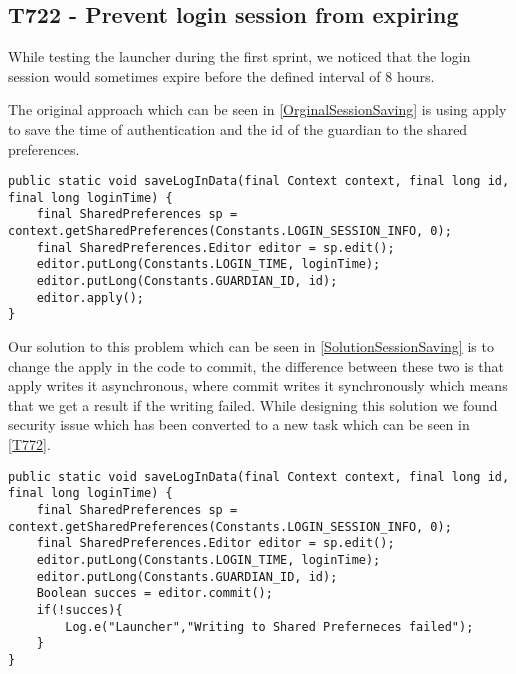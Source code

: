 \subsection{T722 - Prevent login session from expiring}
While testing the launcher during the first sprint, we noticed that the login
session would sometimes expire before the defined interval of 8 hours.\nl

The original approach which can be seen in \autoref{OrginalSessionSaving} is
using apply to save the time of authentication and the id of the guardian to
the shared preferences.\nl

\begin{minipage}[H]{\linewidth}
\begin{lstlisting}[caption = Original approach to saving login session, label =
OrginalSessionSaving]
public static void saveLogInData(final Context context, final long id, final long loginTime) {
    final SharedPreferences sp = context.getSharedPreferences(Constants.LOGIN_SESSION_INFO, 0);
    final SharedPreferences.Editor editor = sp.edit();
    editor.putLong(Constants.LOGIN_TIME, loginTime);
    editor.putLong(Constants.GUARDIAN_ID, id);
    editor.apply();
}
\end{lstlisting} 
\end{minipage}

Our solution to this problem which can be seen in
\autoref{SolutionSessionSaving} is to change the apply in the code to commit,
the difference between these two is that apply writes it asynchronous, where
commit writes it synchronously which means that we get a result if the writing
failed. While designing this solution we found security issue which has been
converted to a new task which can be seen in \autoref{T772}.\nl

\begin{minipage}[H]{\linewidth}
\begin{lstlisting}[caption = Our solution to saving login session, label
=SolutionSessionSaving ]
public static void saveLogInData(final Context context, final long id, final long loginTime) {
    final SharedPreferences sp = context.getSharedPreferences(Constants.LOGIN_SESSION_INFO, 0);
    final SharedPreferences.Editor editor = sp.edit();
    editor.putLong(Constants.LOGIN_TIME, loginTime);
    editor.putLong(Constants.GUARDIAN_ID, id);
    Boolean succes = editor.commit();
    if(!succes){
    	Log.e("Launcher","Writing to Shared Preferneces failed");
	}
} 
\end{lstlisting} 
\end{minipage}

